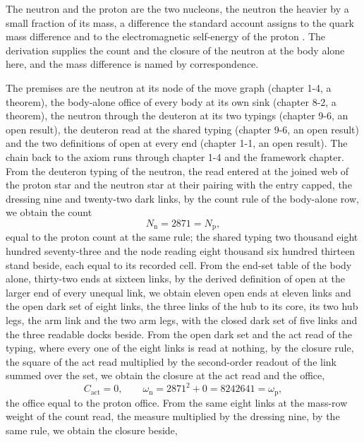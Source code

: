 \begin{chbridge}
The neutron and the proton are the two nucleons, the neutron the heavier by a small fraction of its mass, a difference the standard account assigns to the quark mass difference and to the electromagnetic self-energy of the proton \cite{Chadwick1932,Heisenberg1932}. The derivation supplies the count and the closure of the neutron at the body alone here, and the mass difference is named by correspondence.
\end{chbridge}
\begin{chproof}
The premises are the neutron at its node of the move graph (chapter 1-4, a theorem), the body-alone office of every body at its own sink (chapter 8-2, a theorem), the neutron through the deuteron at its two typings (chapter 9-6, an open result), the deuteron read at the shared typing (chapter 9-6, an open result) and the two definitions of open at every end (chapter 1-1, an open result). The chain back to the axiom runs through chapter 1-4 and the framework chapter. From the deuteron typing of the neutron, the read entered at the joined web of the proton star and the neutron star at their pairing with the entry capped, the dressing nine and twenty-two dark links, by the count rule of the body-alone row, we obtain the count
\begin{equation}
N_{\mathrm{n}} = 2871 = N_{\mathrm{p}} ,
\end{equation}
equal to the proton count at the same rule; the shared typing two thousand eight hundred seventy-three and the node reading eight thousand six hundred thirteen stand beside, each equal to its recorded cell. From the end-set table of the body alone, thirty-two ends at sixteen links, by the derived definition of open at the larger end of every unequal link, we obtain eleven open ends at eleven links and the open dark set of eight links, the three links of the hub to its core, its two hub legs, the arm link and the two arm legs, with the closed dark set of five links and the three readable docks beside. From the open dark set and the act read of the typing, where every one of the eight links is read at nothing, by the closure rule, the square of the act read multiplied by the second-order readout of the link summed over the set, we obtain the closure at the act read and the office,
\begin{equation}
C_{\mathrm{act}} = 0 , \qquad \omega_{\mathrm{n}} = 2871^{2} + 0 = 8242641 = \omega_{\mathrm{p}} ,
\end{equation}
the office equal to the proton office. From the same eight links at the mass-row weight of the count read, the measure multiplied by the dressing nine, by the same rule, we obtain the closure beside,

\end{chproof}
